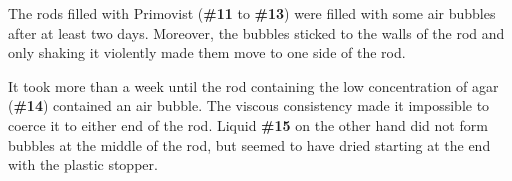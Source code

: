 The rods filled with Primovist (\textbf{\#11} to \textbf{\#13}) were filled with some air bubbles after at least two days.
Moreover, the bubbles sticked to the walls of the rod and only shaking it violently made them move to one side of the rod.

It took more than a week until the rod containing the low concentration of agar (\textbf{\#14}) contained an air bubble.
The viscous consistency made it impossible to coerce it to either end of the rod.
Liquid \textbf{\#15} on the other hand did not form bubbles at the middle of the rod, but seemed to have dried starting at the end with the plastic stopper.

